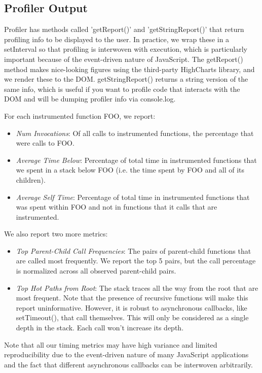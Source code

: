 \documentclass[11pt]{article}
\begin{document}
\subsection{Profiler Output}
Profiler has methods called 'getReport()' and 'getStringReport()' that
return profiling info to be displayed to the user. In practice, we
wrap these in a setInterval so that profiling is interwoven with
execution, which is particularly important because of the event-driven
nature of JavaScript. The getReport() method makes nice-looking
figures using the third-party HighCharts library, and we render these
to the DOM. getStringReport() returns a string version of the same
info, which is useful if you want to profile code that interacts with
the DOM and will be dumping profiler info via console.log. 


For each instrumented function FOO, we report:
\begin{itemize}
\item \textit{Num Invocations}: Of all calls to
  instrumented functions, the percentage that were calls to FOO. 
\item  \textit{Average Time Below}: Percentage of total time in
  instrumented functions that we spent in a stack below FOO (i.e. the
  time spent by FOO and all of its children). 
\item \textit{Average Self Time}: Percentage of total time in
  instrumented functions that was spent within FOO and not in
  functions that it calls that are instrumented. 
\end{itemize}

We also report two more metrics:
\begin{itemize}
\item \textit{Top Parent-Child Call Frequencies}: The pairs of
parent-child functions that are called most frequently. We report the
top 5 pairs, but the call percentage is normalized across all observed
parent-child pairs.
\item \textit{Top Hot Paths from Root}: The stack traces all the way from the root
that are most frequent. Note that the presence of recursive functions
will make this report uninformative. However, it is robust to
asynchronous callbacks, like setTimeout(), that call themselves. This
will only be considered as a single depth in the stack. Each call
won't increase its depth. 
\end{itemize}

Note that all our timing metrics may have high variance and limited
reproducibility due to the event-driven nature of many JavaScript
applications and the fact that different asynchronous callbacks can be
interwoven arbitrarily. 
\end{document}
